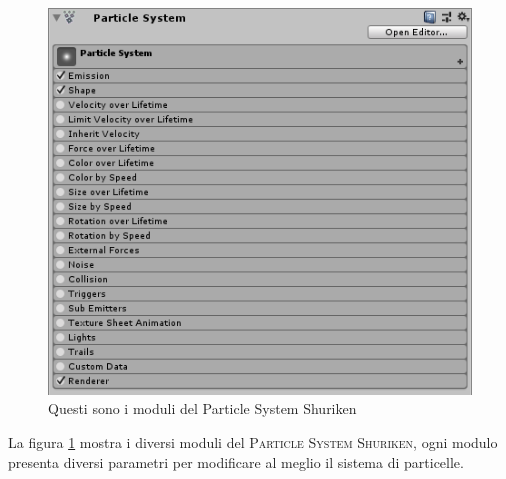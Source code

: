 \documentclass[12pt, openany]{book}
\begin{document}
		\begin{figure}[H]
			\centering
			\includegraphics[width=1\linewidth]{"Immagini/ParticleSystem"}
			\caption{Questi sono i moduli del Particle System Shuriken}
			\label{fig:ParticleSystem}
		\end{figure}
		La figura \ref{fig:ParticleSystem} mostra i diversi moduli  del \textsc{Particle System Shuriken}, ogni modulo presenta diversi parametri per modificare al meglio il sistema di particelle.
\end{document}

